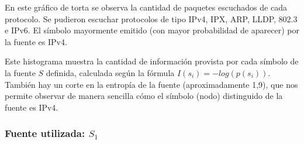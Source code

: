 \documentclass[final,narroweqnarray,inline]{ieee}
\begin{document}

En este gráfico de torta se observa la cantidad de paquetes escuchados de cada
protocolo. Se pudieron escuchar protocolos de tipo IPv4, IPX, ARP, LLDP,
802.3 e IPv6. El símbolo mayormente emitido (con mayor probabilidad de
aparecer) por la fuente es IPv4.

Este histograma muestra la cantidad de información provista por cada símbolo
de la fuente $S$ definida, calculada según la fórmula $ I(s_{i}) =
-log(p(s_{i}))  $. También hay un corte en la entropía de la fuente
(aproximadamente 1,9), que nos permite observar de manera sencilla cómo el símbolo (nodo)
distinguido de la fuente es IPv4.

\subsubsection{Fuente utilizada: $S_{1}$}






\end{document}
